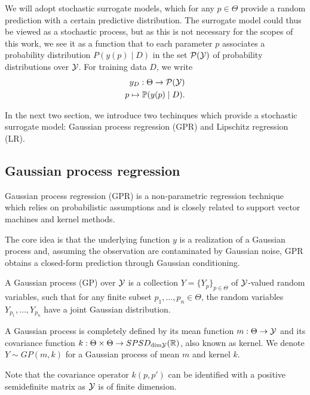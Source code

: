 We will adopt stochastic surrogate models, which for any $p \in \Theta$ provide a random prediction with a certain predictive distribution. 
The surrogate model could thus be viewed as a stochastic process, but as this is not necessary for the scopes of this work, we see it as a function that to each parameter $p$ associates a probability distribution $ P( y(p) \mid D)$ in the set $\mathcal P (\mathcal Y)$ of probability distributions over $\mathcal Y$.
For training data $D$, we write \begin{align*}
    y_D : \Theta \rightarrow \mathcal P( \mathcal Y) \\
    p \mapsto \mathbb P( y(p) \mid D).
\end{align*}

In the next two section, we introduce two techinques which provide a stochastic surrogate model: Gaussian process regression (GPR) and Lipschitz regression (LR).

\subsection{Gaussian process regression}\label{sec:GPR}
Gaussian process regression (GPR) is a non-parametric regression technique which relies on probabilistic assumptions and is closely related to support vector machines and kernel methods.

The core idea is that the underlying function $y$ is a realization of a Gaussian process and, assuming the observation are contaminated by Gaussian noise, GPR obtains a closed-form prediction through Gaussian conditioning.\newline

\begin{dfn} 
    A Gaussian process (GP) over $\mathcal Y$ is a collection $Y = \{Y_p\}_{p\in\Theta}$ of $\mathcal Y$-valued random variables, such that for any finite subset $p_1, \ldots, p_n \in \Theta$, the random variables $Y_{p_1}, \ldots, Y_{p_n}$ have a joint Gaussian distribution.

    A Gaussian process is completely defined by its mean function $m: \Theta \rightarrow \mathcal Y$ and its covariance function $k: \Theta \times \Theta \rightarrow SPSD_{\text{dim}\mathcal Y}(\mathbb{R})$, also known as kernel. 
    We denote $Y \sim GP(m, k)$ for a Gaussian process of mean $m$ and kernel $k$.
\end{dfn}
Note that the covariance operator $k(p, p')$ can be identified with a positive semidefinite matrix as $\mathcal Y$ is of finite dimension. \newline

